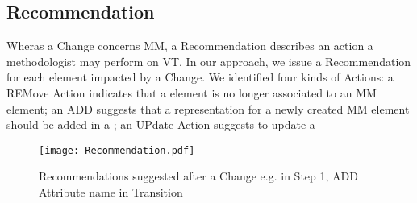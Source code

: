 \subsection{Recommendation}
\label{sec:Suggestion:Recommendation}

Wheras a \textsf{Change} concerns \textsf{MM}, a \textsf{Recommendation} describes
an action a methodologist may perform on \textsf{VT}. In our approach, we
issue a \textsf{Recommendation} for each \viewtype element impacted by a 
\textsf{Change}. We identified four kinds of \textsf{Action}s: a \textsf{REM}ove
\textsf{Action} indicates that a \viewtype element is no longer associated to an
\textsf{MM} element; an \textsf{ADD} suggests that a representation for a newly 
created \textsf{MM} element should be added in a \viewtype; an \textsf{UP}date
\textsf{Action} suggests to update a 


\begin{figure}[t]
    \centering
    \texttt{[image: Recommendation.pdf]}
    \caption{\textsf{Recommendation}s suggested after a \textsf{Change}
    e.g. in Step 1, \textsf{ADD} Attribute \textsf{name} in \textsf{Transition}}
    \label{fig:Recommendation}
\end{figure}